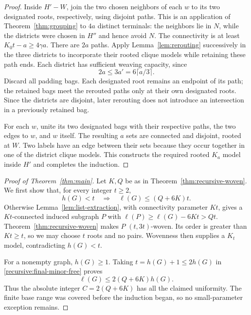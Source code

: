 \begin{proof}
Inside $H'-W$, join the two chosen neighbors of each $w$ to its two
designated roots, respectively, using disjoint paths. This is an
application of Theorem~\ref{thm:grouping} to $4a$ distinct terminals:
the neighbors lie in $N$, while the districts were chosen in $H''$
and hence avoid $N$. The connectivity is at least $K_0t-a\ge4\gamma a$.
There are $2a$ paths. Apply Lemma~\ref{lem:rerouting} successively in the
three districts to incorporate their rooted clique models while
retaining these path ends. Each district has sufficient weaving
capacity, since
\[
 2a\le3a'=6\lceil a/3\rceil.
\]
Discard all padding bags. Each designated root remains an endpoint
of its path; the retained bags meet the rerouted paths only at their
own designated roots. Since the districts are disjoint, later rerouting
does not introduce an intersection in a previously retained bag.

For each $w$, unite its two designated bags with their respective paths,
the two edges to $w$, and $w$ itself. The resulting $a$ sets are connected
and disjoint, rooted at $W$. Two labels have an edge between their sets
because they occur together in one of the district clique models.
This constructs the required rooted $K_a$ model inside $H'$ and
completes the induction.
\end{proof}

\begin{proof}[Proof of Theorem~\ref{thm:main}]
Let $K,Q$ be as in Theorem~\ref{thm:recursive-woven}. We first show that,
for every integer $t\ge2$,
\begin{equation}\label{recursive:final-minor-free}
 h(G)<t\quad\Longrightarrow\quad\ell(G)\le(Q+6K)t.
\end{equation}
Otherwise Lemma~\ref{lem:list-extraction}, with connectivity parameter
$Kt$, gives a $Kt$-connected induced subgraph $P$ with
$\ell(P)\ge\ell(G)-6Kt>Qt$. Theorem~\ref{thm:recursive-woven} makes
$P$ $(t,3t)$-woven. Its order is greater than $Kt\ge t$, so we may choose
$t$ roots and no pairs. Wovenness then supplies a $K_t$ model,
contradicting $h(G)<t$.

For a nonempty graph, $h(G)\ge1$. Taking $t=h(G)+1\le2h(G)$ in
\eqref{recursive:final-minor-free} proves
\[
 \ell(G)\le2(Q+6K)h(G).
\]
Thus the absolute integer $C=2(Q+6K)$ has all the claimed uniformity.
The finite base range was covered before the induction began, so no
small-parameter exception remains.
\end{proof}
